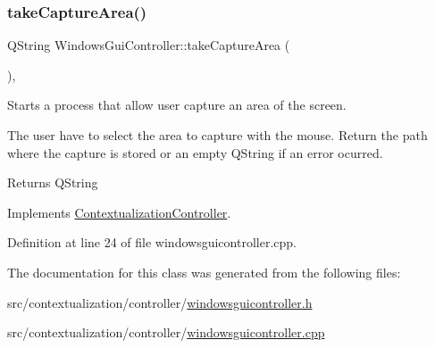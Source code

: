 \mbox{\label{classWindowsGuiController_afcda369c002842873b3fb3cc3a593c06}} 
\subsubsection{\texorpdfstring{take\+Capture\+Area()}{takeCaptureArea()}}
{\footnotesize\ttfamily Q\+String Windows\+Gui\+Controller\+::take\+Capture\+Area (\begin{DoxyParamCaption}{ }\end{DoxyParamCaption})\hspace{0.3cm}{\ttfamily [override]}, {\ttfamily [virtual]}}



Starts a process that allow user capture an area of the screen. 

The user have to select the area to capture with the mouse. Return the path where the capture is stored or an empty Q\+String if an error ocurred. \begin{DoxyReturn}{Returns}
Q\+String 
\end{DoxyReturn}


Implements \mbox{\hyperlink{classContextualizationController_a121919886590cd4955bbcc2d8b747b26}{Contextualization\+Controller}}.



Definition at line 24 of file windowsguicontroller.\+cpp.



The documentation for this class was generated from the following files\+:\begin{DoxyCompactItemize}
\item 
src/contextualization/controller/\mbox{\hyperlink{windowsguicontroller_8h}{windowsguicontroller.\+h}}\item 
src/contextualization/controller/\mbox{\hyperlink{windowsguicontroller_8cpp}{windowsguicontroller.\+cpp}}\end{DoxyCompactItemize}
